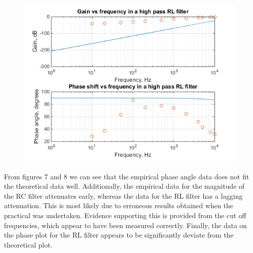 \documentclass{article}
\begin{document}
\begin{center}
	\begin{figure}[H]
		\begin{minipage}{0.6\textwidth}
			\includegraphics[scale=0.8]{bode4}
		\end{minipage}
	\end{figure}
\end{center}

From figures 7 and 8 we can see that the empirical phase angle data does not fit the theoretical data well. Additionally, the empirical data for the magnitude of the RC filter attenuates early, whereas the data for the RL filter has a lagging attenuation. This is most likely due to erroneous results obtained when the practical was undertaken. Evidence supporting this is provided from the cut off frequencies, which appear to have been measured correctly. Finally, the data on the phase plot for the RL filter appears to be significantly deviate from the theoretical plot.



\end{document}

